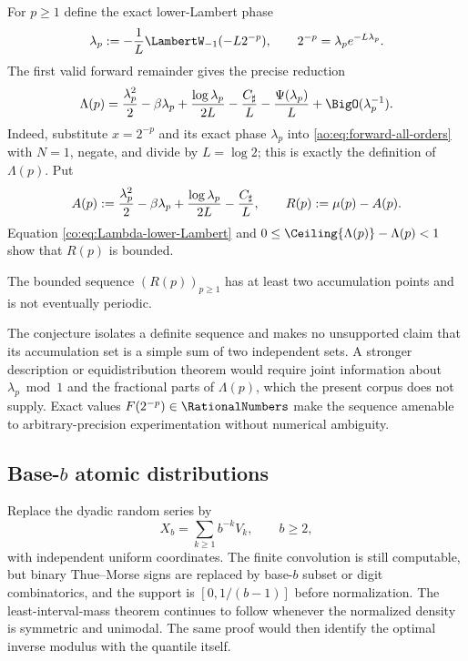 For $p\ge1$ define the exact lower-Lambert phase
\[
 \lambda_p:=-\frac1L\LambertW_{-1}(-L2^{-p}),
 \qquad 2^{-p}=\lambda_p e^{-L\lambda_p}.
\]
The first valid forward remainder gives the precise reduction
\begin{equation}\label{co:eq:Lambda-lower-Lambert}
 \Lambda(p)=\frac{\lambda_p^2}{2}-\beta\lambda_p
 +\frac{\log\lambda_p}{2L}-\frac{\Csharp}{L}
 -\frac{\Psi(\lambda_p)}{L}+\BigO(\lambda_p^{-1}).
\end{equation}
Indeed, substitute $x=2^{-p}$ and its exact phase $\lambda_p$ into
\eqref{ao:eq:forward-all-orders} with $N=1$, negate, and divide by
$L=\log2$; this is exactly the definition of $\Lambda(p)$.
Put
\[
 A(p):=\frac{\lambda_p^2}{2}-\beta\lambda_p
 +\frac{\log\lambda_p}{2L}-\frac{C_{\sharp}}{L},
 \qquad R(p):=\mu(p)-A(p).
\]
Equation \eqref{co:eq:Lambda-lower-Lambert} and
$0\le\Ceiling{\Lambda(p)}-\Lambda(p)<1$ show that $R(p)$ is bounded.

\begin{conjecture}
\label{co:conj:integer-modulus}
The bounded sequence $(R(p))_{p\ge1}$ has at least two accumulation points and
is not eventually periodic.
\end{conjecture}

The conjecture isolates a definite sequence and makes no unsupported claim
that its accumulation set is a simple sum of two independent sets.  A stronger
description or equidistribution theorem would require joint information about
$\lambda_p\bmod1$ and the fractional parts of $\Lambda(p)$, which the present
corpus does not supply.  Exact values $F(2^{-p})\in\RationalNumbers$ make the
sequence amenable to arbitrary-precision experimentation without numerical
ambiguity.

\subsection{Base-\texorpdfstring{$b$}{b} atomic distributions}

Replace the dyadic random series by
\[
 X_b=\sum_{k\ge1}b^{-k}V_k,
 \qquad b\ge2,
\]
with independent uniform coordinates.  The finite convolution is still
computable, but binary Thue--Morse signs are replaced by base-$b$ subset or
digit combinatorics, and the support is $[0,1/(b-1)]$ before normalization.
The least-interval-mass theorem continues to follow whenever the normalized
density is symmetric and unimodal.  The same proof would then identify the
optimal inverse modulus with the quantile itself.

